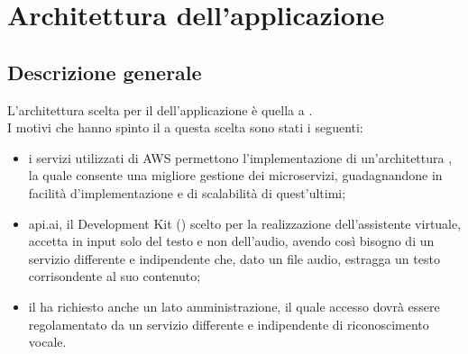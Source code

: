 \section{Architettura dell'applicazione}
\subsection{Descrizione generale}
L'architettura scelta per il  dell'applicazione è quella a .\\
I motivi che hanno spinto il  a questa scelta sono stati i seguenti:
\begin{itemize}
	\item i servizi utilizzati di AWS permettono l'implementazione di un'architettura , la quale consente una migliore gestione dei microservizi, guadagnandone in facilità d'implementazione e di scalabilità di quest'ultimi;
	\item api.ai, il  Development Kit () scelto per la realizzazione dell'assistente virtuale, accetta in input solo del testo e non dell'audio, avendo così bisogno di un servizio differente e indipendente che, dato un file audio, estragga un testo corrisondente al suo contenuto;
	\item il  ha richiesto anche un lato amministrazione, il quale accesso dovrà essere regolamentato da un servizio differente e indipendente di riconoscimento vocale.
\end{itemize}

